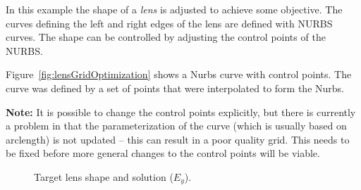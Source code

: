 \documentclass[11pt]{article}
\begin{document}
In this example the shape of a {\em lens} is adjusted to achieve some objective. 
The curves defining the left and right edges of the lens
are defined with NURBS curves. The shape can be controlled by adjusting the control points of the NURBS.

Figure~\ref{fig:lensGridOptimization} shows a Nurbs curve with control points. The curve was defined
by a set of points that were interpolated to form the Nurbs. 

\medskip
\noindent \textbf{Note:} It is possible to change the control points explicitly, but there
is currently a problem in that the parameterization of the curve (which is usually based on arclength)
is not updated -- this can result in a poor quality grid. This needs to be fixed before more general changes to the
control points will be viable. 


{%
%
\newcommand{\figWidth}{5cm}%
\newcommand{\trimfig}[2]{\trimh{#1}{#2}{.15}{.15}{.35}{.35}}
\begin{figure}[htb]
\begin{center}
\end{center}
  \caption{Target lens shape and solution ($E_y$).}
  \label{fig:lensTarget}
\end{figure}
}
\end{document}
